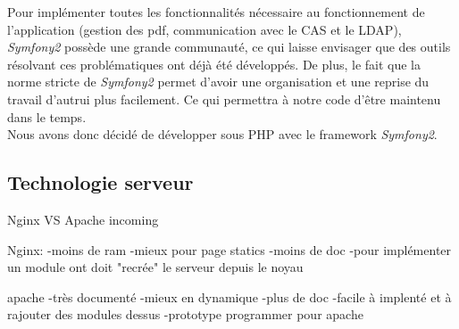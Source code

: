 Pour implémenter toutes les fonctionnalités nécessaire au fonctionnement de l'application (gestion des pdf, communication avec le CAS et le LDAP), \textit{Symfony2} possède une grande communauté, ce qui laisse envisager que des outils résolvant ces problématiques ont déjà été développés.
De plus, le fait que la norme stricte de \textit{Symfony2} permet d'avoir une organisation et une reprise du travail d'autrui plus facilement. Ce qui permettra à notre code d'être maintenu dans le temps.\\

Nous avons donc décidé de développer sous PHP avec le framework \textit{Symfony2}.

\subsection{Technologie serveur}

Nginx VS Apache incoming



Nginx:
-moins de ram
-mieux pour page statics
-moins de doc
-pour implémenter un module ont doit "recrée" le serveur depuis le noyau

apache
-très documenté
-mieux en dynamique
-plus de doc
-facile à implenté et à rajouter des modules dessus
-prototype programmer pour apache

